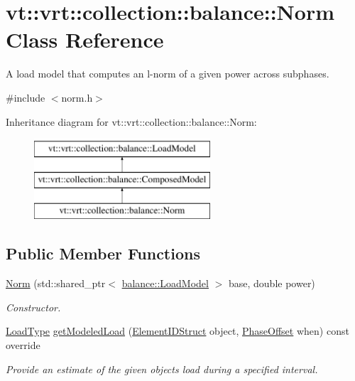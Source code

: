 \hypertarget{classvt_1_1vrt_1_1collection_1_1balance_1_1_norm}{}\section{vt\+:\+:vrt\+:\+:collection\+:\+:balance\+:\+:Norm Class Reference}
\label{classvt_1_1vrt_1_1collection_1_1balance_1_1_norm}


A load model that computes an l-\/norm of a given power across subphases.  




{\ttfamily \#include $<$norm.\+h$>$}

Inheritance diagram for vt\+:\+:vrt\+:\+:collection\+:\+:balance\+:\+:Norm\+:\begin{figure}[H]
\begin{center}
\leavevmode
\includegraphics[height=3.000000cm]{classvt_1_1vrt_1_1collection_1_1balance_1_1_norm}
\end{center}
\end{figure}
\subsection*{Public Member Functions}
\begin{DoxyCompactItemize}
\item 
\hyperlink{classvt_1_1vrt_1_1collection_1_1balance_1_1_norm_a054625ebe2a8dcd9f986f36f40b70ada}{Norm} (std\+::shared\+\_\+ptr$<$ \hyperlink{structvt_1_1vrt_1_1collection_1_1balance_1_1_load_model}{balance\+::\+Load\+Model} $>$ base, double power)
\begin{DoxyCompactList}\small\item\em Constructor. \end{DoxyCompactList}\item 
\hyperlink{namespacevt_a8fb51741340b87d7aaee0bef60e9896b}{Load\+Type} \hyperlink{classvt_1_1vrt_1_1collection_1_1balance_1_1_norm_a900366f7ff6371f48ed4b1f734f99ab5}{get\+Modeled\+Load} (\hyperlink{namespacevt_1_1vrt_1_1collection_1_1balance_a9f5b53fafb270212279a4757d2c4cd28}{Element\+I\+D\+Struct} object, \hyperlink{structvt_1_1vrt_1_1collection_1_1balance_1_1_phase_offset}{Phase\+Offset} when) const override
\begin{DoxyCompactList}\small\item\em Provide an estimate of the given object\textquotesingle{}s load during a specified interval. \end{DoxyCompactList}\end{DoxyCompactItemize}
